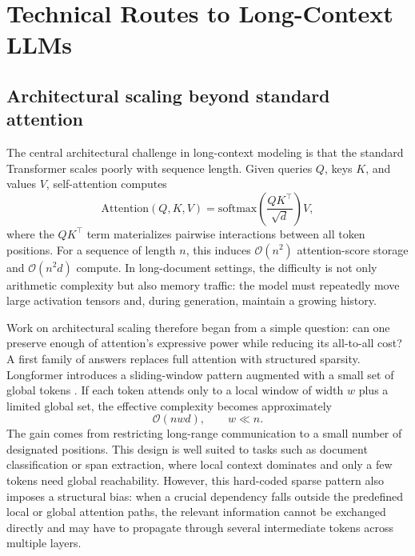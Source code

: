\documentclass[11pt]{article}
\begin{document}
\section{Technical Routes to Long-Context LLMs}
\label{sec:survey}

\subsection{Architectural scaling beyond standard attention}
The central architectural challenge in long-context modeling is that the standard Transformer scales poorly with sequence length. Given queries $Q$, keys $K$, and values $V$, self-attention computes
\begin{equation}
\mathrm{Attention}(Q,K,V)=\mathrm{softmax}\left(\frac{QK^\top}{\sqrt{d}}\right)V,
\end{equation}
where the $QK^\top$ term materializes pairwise interactions between all token positions. For a sequence of length $n$, this induces $\mathcal{O}(n^2)$ attention-score storage and $\mathcal{O}(n^2 d)$ compute. In long-document settings, the difficulty is not only arithmetic complexity but also memory traffic: the model must repeatedly move large activation tensors and, during generation, maintain a growing history.

Work on architectural scaling therefore began from a simple question: can one preserve enough of attention's expressive power while reducing its all-to-all cost? A first family of answers replaces full attention with structured sparsity. Longformer introduces a sliding-window pattern augmented with a small set of global tokens \citep{beltagy2020longformer}. If each token attends only to a local window of width $w$ plus a limited global set, the effective complexity becomes approximately
\begin{equation}
\mathcal{O}(nwd), \qquad w \ll n.
\end{equation}
The gain comes from restricting long-range communication to a small number of designated positions. This design is well suited to tasks such as document classification or span extraction, where local context dominates and only a few tokens need global reachability. However, this hard-coded sparse pattern also imposes a structural bias: when a crucial dependency falls outside the predefined local or global attention paths, the relevant information cannot be exchanged directly and may have to propagate through several intermediate tokens across multiple layers.
\end{document}
